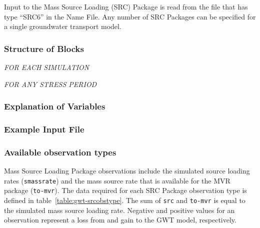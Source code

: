 Input to the Mass Source Loading (SRC) Package is read from the file that has type ``SRC6'' in the Name File.  Any number of SRC Packages can be specified for a single groundwater transport model.

\vspace{5mm}
\subsubsection{Structure of Blocks}
\vspace{5mm}

\noindent \textit{FOR EACH SIMULATION}


\vspace{5mm}
\noindent \textit{FOR ANY STRESS PERIOD}

\packageperioddescription

\vspace{5mm}
\subsubsection{Explanation of Variables}
\begin{description}

\end{description}

\vspace{5mm}
\subsubsection{Example Input File}


\vspace{5mm}
\subsubsection{Available observation types}
Mass Source Loading Package observations include the simulated source loading rates (\texttt{smassrate}) and the mass source rate that is available for the MVR package (\texttt{to-mvr}). The data required for each SRC Package observation type is defined in table~\ref{table:gwt-srcobstype}. The sum of \texttt{src} and \texttt{to-mvr} is equal to the simulated mass source loading rate. Negative and positive values for an observation represent a loss from and gain to the GWT model, respectively.

